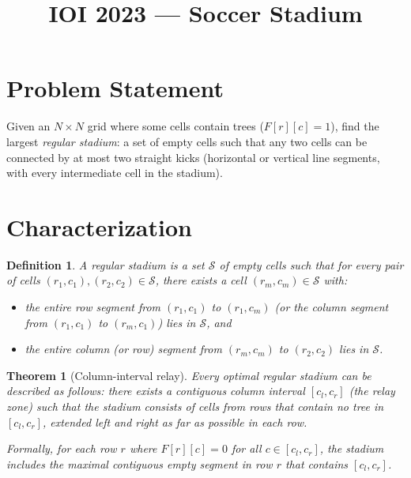 \documentclass[11pt,a4paper]{article}
\title{IOI 2023 --- Soccer Stadium}
\author{}
\date{}
\newtheorem{theorem}{Theorem}
\newtheorem{definition}{Definition}
\begin{document}
\maketitle

\section{Problem Statement}

Given an $N \times N$ grid where some cells contain trees ($F[r][c] = 1$),
find the largest \emph{regular stadium}: a set of empty cells such that
any two cells can be connected by at most two straight kicks
(horizontal or vertical line segments, with every intermediate cell in
the stadium).

\section{Characterization}

\begin{definition}
A \emph{regular stadium} is a set $\mathcal{S}$ of empty cells such that
for every pair of cells $(r_1, c_1), (r_2, c_2) \in \mathcal{S}$, there
exists a cell $(r_m, c_m) \in \mathcal{S}$ with:
\begin{itemize}
  \item the entire row segment from $(r_1, c_1)$ to $(r_1, c_m)$ (or the
        column segment from $(r_1, c_1)$ to $(r_m, c_1)$) lies in
        $\mathcal{S}$, and
  \item the entire column (or row) segment from $(r_m, c_m)$ to
        $(r_2, c_2)$ lies in $\mathcal{S}$.
\end{itemize}
\end{definition}

\begin{theorem}[Column-interval relay]\label{thm:relay}
Every optimal regular stadium can be described as follows: there exists
a contiguous column interval $[c_l, c_r]$ (the \emph{relay zone}) such
that the stadium consists of cells from rows that contain no tree in
$[c_l, c_r]$, extended left and right as far as possible in each row.

Formally, for each row $r$ where $F[r][c] = 0$ for all $c \in [c_l, c_r]$,
the stadium includes the maximal contiguous empty segment in row $r$
that contains $[c_l, c_r]$.
\end{theorem}
\end{document}
